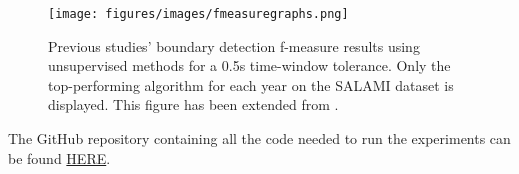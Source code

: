 
\begin{figure}
    \centering
    \texttt{[image: figures/images/fmeasuregraphs.png]}
    \caption[Baseline. State-of-the-art graph.]{Previous studies' boundary detection f-measure results using unsupervised methods for a 0.5s time-window tolerance. Only the top-performing algorithm for each year on the SALAMI dataset is displayed. This figure has been extended from \cite{Hernandez-Olivan2021MusicFeatures}.}
    \label{fig:enter-label}
\end{figure}

The GitHub repository containing all the code needed to run the experiments can be found \href{https://github.com/oriolcolomefont/Master-Thesis.git}{HERE}.


